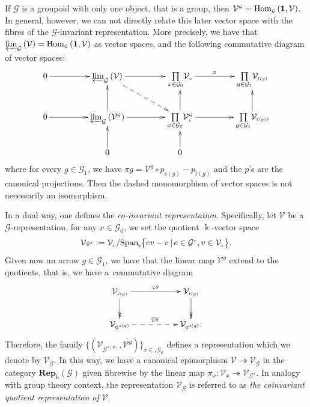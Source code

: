 \documentclass[pdftex]{sigma}
\numberwithin{equation}{section}
\renewcommand{\hom}[3]{\mathrm{Hom}_{\Sscript{#1}}\left(#2, #3\right)}
\newcommand{\bara}[1]{\overline{#1}}
\newcommand{\Rep}[1]{\mathbf{Rep}_{\Sscript{\Bbbk}}(#1)}
\newcommand{\Go}{\cG_{\Sscript{0}}}
\newcommand{\Ga}{\cG_{\Sscript{1}}}
\newcommand{\Vx}{\cV_{\Sscript{x}}}
\newcommand{\Vg}{\cV^{\Sscript{g}}}
\newcommand{\cG}{{\mathcal G}}
\newcommand{\cV}{{\mathcal V}}
\newcommand{\Gx}{\mathcal{G}^{\Sscript{x}}}
\newcommand{\Sscript}[1]{\scriptscriptstyle{#1}}
\newcommand{\prolimit}[2]{\varprojlim_{#1}\left({#2}\right)}
\newcommand{\Vgx}{\cV^{\Sscript{\cG}}_{\Sscript{x}}}
\begin{document}
\begin{Remark}\label{rem:invaraiant} If $\cG$ is a groupoid with only one object, that is a group, then $\cV^{\Sscript{\cG}} = \hom{\cG}{\bf 1}{\cV}$. In general, however, we can not directly relate this later vector space with the fibres of the $\cG$-invariant representation. More precisely, we have that $\prolimit{\cG}{\cV} = \hom{\cG}{\bf 1}{\cV}$ as vector spaces, and the following commutative diagram of vector spaces:
\begin{gather*}
\xymatrix@C=45pt{ 0 \ar@{->}^-{}[r] & \prolimit{\cG}{\cV} \ar@{->}^-{}[r] \ar@{-->}^-{}[dr] & \underset{x \in \Go}{\prod} \Vx \ar@{->}^-{\pi}[r] & \underset{g \in \Ga}{\prod} \cV_{\Sscript{t(g)}} \\ 0 \ar@{->}^-{}[r] & \prolimit{\cG}{\cV^{\Sscript{\cG}}} \ar@{->}^-{}[r] \ar@{->}^-{}[u] & \underset{x \in \Go}{\prod} \Vgx \ar@{->}^-{}[u] \ar@{->}^-{}[r] & \underset{g \in \Ga}{\prod} \cV_{\Sscript{t(g)}}, \ar@{->}^-{}[u] \\ & 0 \ar@{->}^-{}[u] & 0 \ar@{->}^-{}[u] &}
\end{gather*}
where for every $g \in \Ga$, we have $\pi{\Sscript{g}}= \Vg \circ p_{\Sscript{s(g)}} - p_{\Sscript{t(g)}}$ and the $p$'s are the canonical projections. Then the dashed monomorphism of vector spaces is not necessarily an isomorphism.
\end{Remark}

In a dual way, one defines the \emph{co-invariant representation}. Specifically, let $\cV$ be a $\cG$-representation, for any $x \in \Go$, we set the quotient $\Bbbk$-vector space
\begin{gather*}
\cV{\Sscript{\Gx}}: = \Vx/ {\rm Span}_{\Sscript{\Bbbk}} \big\{ ev-v\,|\, e \in \Gx, v \in \Vx \big\}.
\end{gather*}
Given now an arrow $g \in\Ga$, we have that the linear map $\cV^{\Sscript{g}}$ extend to the quotients, that is, we have a~commutative diagram
\begin{gather*}
\xymatrix{ \cV_{\Sscript{s(g)}}
\ar@{->}^-{\Sscript{\cV^{\Sscript{g}}}}[rr] \ar@{->>}^-{}[d] &&
\cV_{\Sscript{t(g)}} \ar@{->>}^-{}[d] \\ \cV_{\Sscript{\cG^{s(g)}}}
\ar@{-->}^-{\Sscript{\bara{\cV^{\Sscript{g}}}}}[rr] & &
\cV_{\Sscript{\cG^{t(g)}}}. }
\end{gather*}
Therefore, the family $\{(\cV_{\Sscript{\cG^{s(g)}}}, \bara{\cV^{\Sscript{g}}} )\}_{x \in, \Go}$ defines a representation which we denote by $\cV_{\Sscript{\cG}}$. In this way, we have a canonical epimorphism $\cV \twoheadrightarrow \cV_{\Sscript{\cG}}$ in the category $\Rep{\cG}$ given fibrewise by the linear map $\pi_{\Sscript{x}}\colon \Vx \twoheadrightarrow \cV_{\Sscript{\cG^x}}$. In analogy with group theory context, the representation $\cV_{\Sscript{\cG}}$ is referred to as \emph{the coinvariant quotient representation of $\cV$}.
\end{document}
